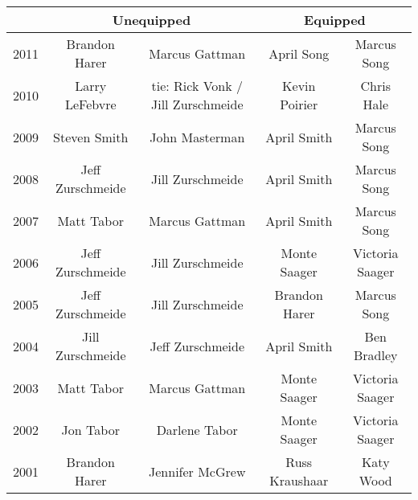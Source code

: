 \begin{tabular}{ |c|c|c|c|c| }
  \hline
  \multicolumn{1}{|c|}{} &
  \multicolumn{2}{|c|}{Unequipped} &
  \multicolumn{2}{|c|}{Equipped} \\
  \hline
  2011 & Brandon Harer & Marcus Gattman & April Song & Marcus Song \\
  2010 & Larry LeFebvre & tie: Rick Vonk / Jill Zurschmeide & Kevin Poirier & Chris Hale \\
  2009 & Steven Smith & John Masterman & April Smith & Marcus Song \\
  2008 & Jeff Zurschmeide & Jill Zurschmeide & April Smith & Marcus Song \\
  2007 & Matt Tabor & Marcus Gattman & April Smith & Marcus Song \\
  2006 & Jeff Zurschmeide & Jill Zurschmeide & Monte Saager & Victoria Saager \\
  2005 & Jeff Zurschmeide & Jill Zurschmeide & Brandon Harer & Marcus Song \\
  2004 & Jill Zurschmeide & Jeff Zurschmeide & April Smith & Ben Bradley \\
  2003 & Matt Tabor & Marcus Gattman & Monte Saager & Victoria Saager \\
  2002 & Jon Tabor & Darlene Tabor & Monte Saager & Victoria Saager \\
  2001 & Brandon Harer & Jennifer McGrew & Russ Kraushaar & Katy Wood \\
  \hline
\end{tabular}